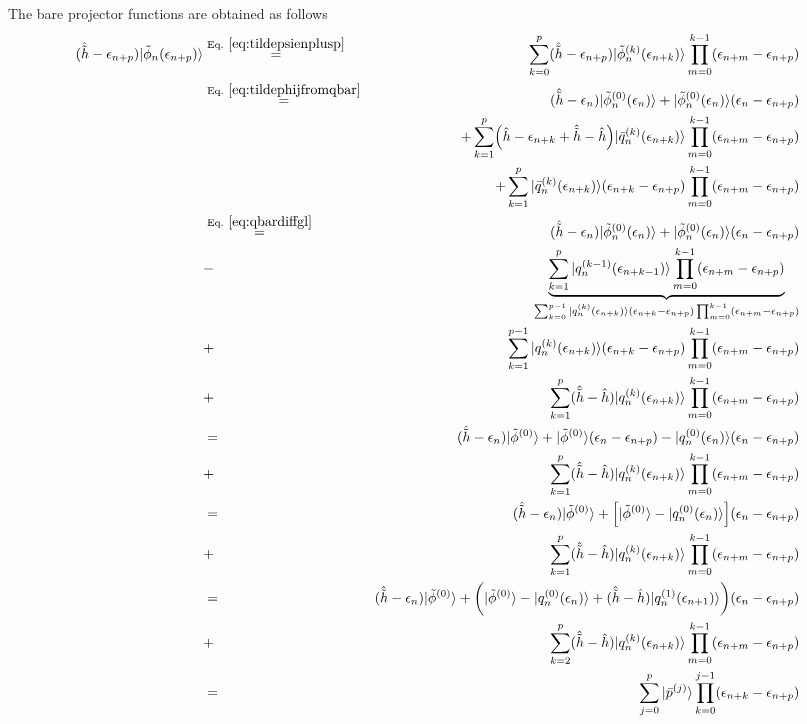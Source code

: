 \documentclass[11pt,a4paper]{report}
\begin{document}
The bare projector functions are obtained as follows
\begin{eqnarray}
(\hat{\tilde{h}}-\epsilon_{n+p})
|\tilde{\phi}_n(\epsilon_{n+p})\rangle
&\eqrel{eq:tildepsienplusp}{=}&
\sum_{k=0}^{p}
(\hat{\tilde{h}}-\epsilon_{n+p})
|\tilde{\phi}_n^{(k)}(\epsilon_{n+k})\rangle
\prod_{m=0}^{k-1}(\epsilon_{n+m}-\epsilon_{n+p})
\nonumber\\
&\eqrel{eq:tildephijfromqbar}{=}&
(\hat{\tilde{h}}-\epsilon_{n})|\tilde{\phi}_n^{(0)}(\epsilon_{n})\rangle
+|\tilde{\phi}^{(0)}_n(\epsilon_{n})\rangle(\epsilon_n-\epsilon_{n+p})
\nonumber\\
&&+
\sum_{k=1}^{p}
\Bigl(\hat{h}-\epsilon_{n+k}+\hat{\tilde{h}}-\hat{h}\Bigr)
|\bar{q}_n^{(k)}(\epsilon_{n+k})\rangle
\prod_{m=0}^{k-1}(\epsilon_{n+m}-\epsilon_{n+p})
\nonumber\\
&&+
\sum_{k=1}^{p}
|\bar{q}_n^{(k)}(\epsilon_{n+k})\rangle(\epsilon_{n+k}-\epsilon_{n+p})
\prod_{m=0}^{k-1}(\epsilon_{n+m}-\epsilon_{n+p})
\nonumber\\
&\eqrel{eq:qbardiffgl}{=}&
(\hat{\tilde{h}}-\epsilon_{n})|\tilde{\phi}_n^{(0)}(\epsilon_{n})\rangle
+|\tilde{\phi}^{(0)}_n(\epsilon_{n})\rangle(\epsilon_n-\epsilon_{n+p})
\nonumber\\
&-&
\underbrace{\sum_{k=1}^{p}
|q_n^{(k-1)}(\epsilon_{n+k-1})\rangle
\prod_{m=0}^{k-1}(\epsilon_{n+m}-\epsilon_{n+p})}
_{
\sum_{k=0}^{p-1}
|q_n^{(k)}(\epsilon_{n+k})\rangle(\epsilon_{n+k}-\epsilon_{n+p})
\prod_{m=0}^{k-1}(\epsilon_{n+m}-\epsilon_{n+p})
}
\nonumber\\
&+&\sum_{k=1}^{p-1}
|q_n^{(k)}(\epsilon_{n+k})\rangle(\epsilon_{n+k}-\epsilon_{n+p})
\prod_{m=0}^{k-1}(\epsilon_{n+m}-\epsilon_{n+p})
\nonumber\\
&+&\sum_{k=1}^{p}
(\hat{\tilde{h}}-\hat{h})
|q_n^{(k)}(\epsilon_{n+k})\rangle
\prod_{m=0}^{k-1}(\epsilon_{n+m}-\epsilon_{n+p})
\nonumber\\
&=&
(\hat{\tilde{h}}-\epsilon_{n})|\tilde{\phi}^{(0)}\rangle
+|\tilde{\phi}^{(0)}\rangle(\epsilon_n-\epsilon_{n+p})
-|q_n^{(0)}(\epsilon_{n})\rangle(\epsilon_{n}-\epsilon_{n+p})
\nonumber\\
&+&\sum_{k=1}^{p}
(\hat{\tilde{h}}-\hat{h})
|q_n^{(k)}(\epsilon_{n+k})\rangle
\prod_{m=0}^{k-1}(\epsilon_{n+m}-\epsilon_{n+p})
\nonumber\\
&=&
(\hat{\tilde{h}}-\epsilon_{n})|\tilde{\phi}^{(0)}\rangle
+
\Bigl[|\tilde{\phi}^{(0)}\rangle-|q_n^{(0)}(\epsilon_{n})\rangle\Bigr]
(\epsilon_n-\epsilon_{n+p})
\nonumber\\
&+&\sum_{k=1}^{p}
(\hat{\tilde{h}}-\hat{h})
|q_n^{(k)}(\epsilon_{n+k})\rangle
\prod_{m=0}^{k-1}(\epsilon_{n+m}-\epsilon_{n+p})
\nonumber\\
&=&
(\hat{\tilde{h}}-\epsilon_{n})|\tilde{\phi}^{(0)}\rangle
+
\biggl(
|\tilde{\phi}^{(0)}\rangle-|q_n^{(0)}(\epsilon_{n})\rangle
+(\hat{\tilde{h}}-\hat{h})
|q_n^{(1)}(\epsilon_{n+1})\rangle\biggr)(\epsilon_n-\epsilon_{n+p})
\nonumber\\
&+&\sum_{k=2}^{p}
(\hat{\tilde{h}}-\hat{h})
|q_n^{(k)}(\epsilon_{n+k})\rangle
\prod_{m=0}^{k-1}(\epsilon_{n+m}-\epsilon_{n+p})
\nonumber\\
&=&\sum_{j=0}^{p}|\bar{p}^{(j)}\rangle
\prod_{k=0}^{j-1}(\epsilon_{n+k}-\epsilon_{n+p})
\end{eqnarray}
\end{document}
